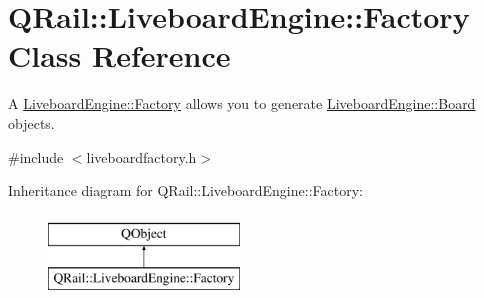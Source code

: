 \hypertarget{classQRail_1_1LiveboardEngine_1_1Factory}{}\section{Q\+Rail\+::Liveboard\+Engine\+::Factory Class Reference}
\label{classQRail_1_1LiveboardEngine_1_1Factory}


A \mbox{\hyperlink{classQRail_1_1LiveboardEngine_1_1Factory}{Liveboard\+Engine\+::\+Factory}} allows you to generate \mbox{\hyperlink{classQRail_1_1LiveboardEngine_1_1Board}{Liveboard\+Engine\+::\+Board}} objects.  




{\ttfamily \#include $<$liveboardfactory.\+h$>$}

Inheritance diagram for Q\+Rail\+::Liveboard\+Engine\+::Factory\+:\begin{figure}[H]
\begin{center}
\leavevmode
\includegraphics[height=2.000000cm]{classQRail_1_1LiveboardEngine_1_1Factory}
\end{center}
\end{figure}
